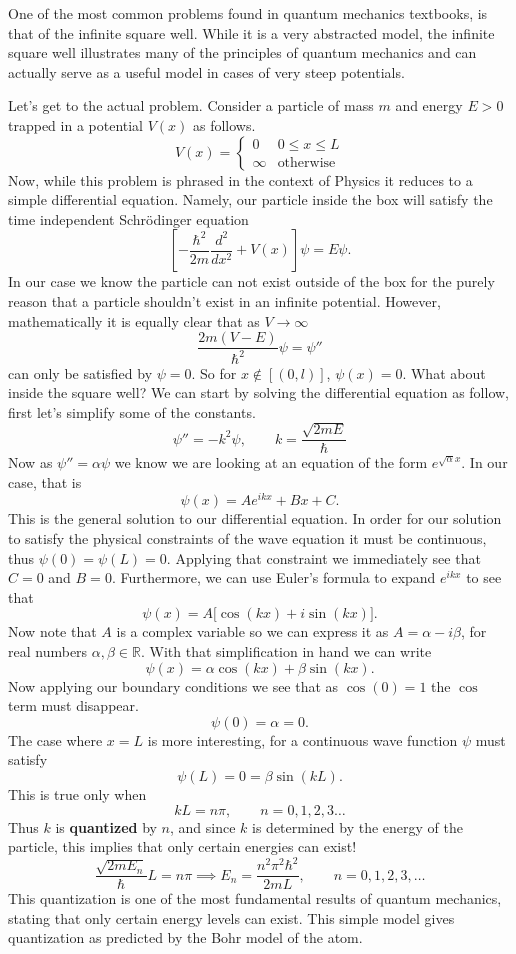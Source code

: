 \documentclass[10pt]{article}
\renewcommand{\to}[0]{\longrightarrow}
\begin{document}
One of the most common problems found in quantum mechanics textbooks, is that of the infinite square well. While it is a very abstracted model, the infinite square well illustrates many of the principles of quantum mechanics and can actually serve as a useful model in cases of very steep potentials. 

Let's get to the actual problem. Consider a particle of mass $m$ and energy $E > 0$ trapped in a potential $V(x)$ as follows.
\[
  V(x) = \begin{cases}
    0  & 0 \leq x \leq L \\
    \infty  & \text{otherwise}  
 \end{cases} 
\]
Now, while this problem is phrased in the context of Physics it reduces to a simple differential equation. Namely, our particle inside the box will satisfy the time independent Schr\"{o}dinger equation 
\[
  \left[ -\frac{\hbar^2}{2m} \frac{d^2}{dx^2} + V(x) \right] \psi = E \psi  .
\]
In our case we know the particle can not exist outside of the box for the purely reason that a particle shouldn't exist in an infinite potential. However, mathematically it is equally clear that as $V \to \infty$ 
\[
  \frac{2m(V - E)}{\hbar^2} \psi = \psi''
\]
can only be satisfied by $\psi = 0$. So for $x \notin [(0, l)]$, $\psi(x) = 0$. What about inside the square well? We can start by solving the differential equation as follow, first let's simplify some of the constants.
\[
  \psi'' = -k^2\psi, \qquad k = \frac{\sqrt{2mE}}{\hbar}
\]
Now as $\psi'' = \alpha \psi$ we know we are looking at an equation of the form $e^{\sqrt{\alpha} x}$. In our case, that is 
\[
  \psi(x) = A e^{ikx} + Bx + C.
\]
This is the general solution to our differential equation. In order for our solution to satisfy the physical constraints of the wave equation it must be continuous, thus $\psi(0) = \psi(L) = 0$. Applying that constraint we immediately see that $C = 0$ and  $B = 0$. Furthermore, we can use Euler's formula to expand $e^{ikx}$ to see that 
\[
  \psi(x) = A\big[ \cos(kx) + i\sin(kx) \big].
\]
Now note that $A$ is a complex variable so we can express it as $A = \alpha -i\beta$, for real numbers $\alpha, \beta \in \mathbb{R}$. With that simplification in hand we can write 
\[
  \psi(x) = \alpha \cos(kx) + \beta\sin(kx).
\] 
Now applying our boundary conditions we see that as $\cos(0) = 1$ the $\cos$ term must disappear.
\[
  \psi(0) = \alpha = 0. 
\] 
The case where $x = L$ is more interesting, for a continuous wave function $\psi$ must satisfy 
\[
  \psi(L) = 0 = \beta \sin(kL).
\]
This is true only when 
\[
    kL = n\pi, \qquad n = 0,1,2,3\dots 
\]
Thus $k$ is \textbf{quantized} by $n$, and since $k$ is determined by the energy of the particle, this implies that only certain energies can exist!
\[
  \frac{\sqrt{2mE_n}}{\hbar}L = n \pi \implies E_n = \frac{n^2\pi^2\hbar^2}{2mL}, \qquad 
  n = 0,1,2,3, \dots 
\]
This quantization is one of the most fundamental results of quantum mechanics, stating that only certain energy levels can exist. This simple model gives quantization as predicted by the Bohr model of the atom. 
\end{document}

